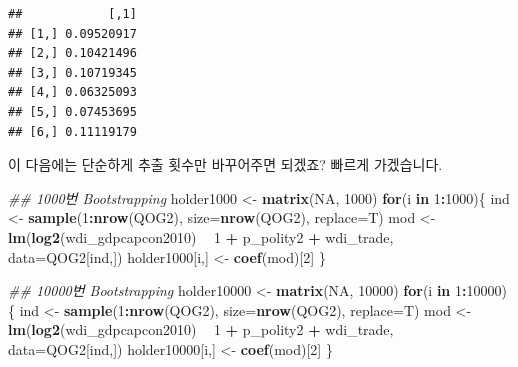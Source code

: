 \documentclass[
]{book}
\newenvironment{Shaded}{\begin{snugshade}}{\end{snugshade}}
\newcommand{\CommentTok}[1]{\textcolor[rgb]{0.56,0.35,0.01}{\textit{#1}}}
\newcommand{\ControlFlowTok}[1]{\textcolor[rgb]{0.13,0.29,0.53}{\textbf{#1}}}
\newcommand{\DataTypeTok}[1]{\textcolor[rgb]{0.13,0.29,0.53}{#1}}
\newcommand{\DecValTok}[1]{\textcolor[rgb]{0.00,0.00,0.81}{#1}}
\newcommand{\KeywordTok}[1]{\textcolor[rgb]{0.13,0.29,0.53}{\textbf{#1}}}
\newcommand{\NormalTok}[1]{#1}
\newcommand{\OperatorTok}[1]{\textcolor[rgb]{0.81,0.36,0.00}{\textbf{#1}}}
\newcommand{\OtherTok}[1]{\textcolor[rgb]{0.56,0.35,0.01}{#1}}
\newcommand{\StringTok}[1]{\textcolor[rgb]{0.31,0.60,0.02}{#1}}
\begin{document}
\begin{verbatim}
##            [,1]
## [1,] 0.09520917
## [2,] 0.10421496
## [3,] 0.10719345
## [4,] 0.06325093
## [5,] 0.07453695
## [6,] 0.11119179
\end{verbatim}

이 다음에는 단순하게 추출 횟수만 바꾸어주면 되겠죠? 빠르게 가겠습니다.

\begin{Shaded}
\begin{Highlighting}[]
\CommentTok{## 1000번 Bootstrapping}
\NormalTok{holder1000 <-}\StringTok{ }\KeywordTok{matrix}\NormalTok{(}\OtherTok{NA}\NormalTok{, }\DecValTok{1000}\NormalTok{)}
\ControlFlowTok{for}\NormalTok{(i }\ControlFlowTok{in} \DecValTok{1}\OperatorTok{:}\DecValTok{1000}\NormalTok{)\{}
\NormalTok{  ind <-}\StringTok{ }\KeywordTok{sample}\NormalTok{(}\DecValTok{1}\OperatorTok{:}\KeywordTok{nrow}\NormalTok{(QOG2), }
                \DataTypeTok{size=}\KeywordTok{nrow}\NormalTok{(QOG2), }\DataTypeTok{replace=}\NormalTok{T)}
\NormalTok{  mod <-}\StringTok{ }\KeywordTok{lm}\NormalTok{(}\KeywordTok{log2}\NormalTok{(wdi_gdpcapcon2010) }\OperatorTok{~}\StringTok{ }
\StringTok{              }\DecValTok{1} \OperatorTok{+}\StringTok{  }\NormalTok{p_polity2 }\OperatorTok{+}\StringTok{ }\NormalTok{wdi_trade,}
            \DataTypeTok{data=}\NormalTok{QOG2[ind,])}
\NormalTok{  holder1000[i,] <-}\StringTok{ }\KeywordTok{coef}\NormalTok{(mod)[}\DecValTok{2}\NormalTok{]}
\NormalTok{\}}

\CommentTok{## 10000번 Bootstrapping}
\NormalTok{holder10000 <-}\StringTok{ }\KeywordTok{matrix}\NormalTok{(}\OtherTok{NA}\NormalTok{, }\DecValTok{10000}\NormalTok{)}
\ControlFlowTok{for}\NormalTok{(i }\ControlFlowTok{in} \DecValTok{1}\OperatorTok{:}\DecValTok{10000}\NormalTok{)\{}
\NormalTok{  ind <-}\StringTok{ }\KeywordTok{sample}\NormalTok{(}\DecValTok{1}\OperatorTok{:}\KeywordTok{nrow}\NormalTok{(QOG2),}
                \DataTypeTok{size=}\KeywordTok{nrow}\NormalTok{(QOG2), }\DataTypeTok{replace=}\NormalTok{T)}
\NormalTok{  mod <-}\StringTok{ }\KeywordTok{lm}\NormalTok{(}\KeywordTok{log2}\NormalTok{(wdi_gdpcapcon2010) }\OperatorTok{~}\StringTok{ }
\StringTok{              }\DecValTok{1} \OperatorTok{+}\StringTok{  }\NormalTok{p_polity2 }\OperatorTok{+}\StringTok{ }\NormalTok{wdi_trade,}
            \DataTypeTok{data=}\NormalTok{QOG2[ind,])}
\NormalTok{  holder10000[i,] <-}\StringTok{ }\KeywordTok{coef}\NormalTok{(mod)[}\DecValTok{2}\NormalTok{]}
\NormalTok{\}}


\end{Highlighting}
\end{Shaded}
\end{document}
